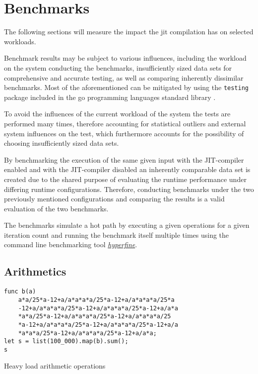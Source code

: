 \chapter{Benchmarks}
\label{sec:benchmarks}

The following sections will measure the impact the jit compilation has on
selected workloads.

Benchmark results may be subject to various influences, including the workload
on the system conducting the benchmarks, insufficiently sized data sets for
comprehensive and accurate testing, as well as comparing inherently dissimilar
benchmarks. Most of the aforementioned can be mitigated by using the
\texttt{testing} package included in the go programming languages standard
library \cite{go_testing}. 

To avoid the influences of the current workload of the system the tests are
performed many times, therefore accounting for statistical outliers and
external system influences on the test, which furthermore accounts for the
possibility of choosing insufficiently sized data sets.

By benchmarking the execution of the same given input with the JIT-compiler
enabled and with the JIT-compiler disabled an inherently comparable data set is
created due to the shared purpose of evaluating the runtime performance under
differing runtime configurations. Therefore, conducting benchmarks under the
two previously mentioned configurations and comparing the results is a valid
evaluation of the two benchmarks.

The benchmarks simulate a hot path by executing a given operations for a given
iteration count and running the benchmark itself multiple times using the
command line benchmarking tool
\href{https://github.com/sharkdp/hyperfine}{\textit{hyperfine}}.


\section{Arithmetics}

\begin{listing}[H]
    \begin{verbatim}
func b(a)
    a*a/25*a-12+a/a*a*a*a/25*a-12+a/a*a*a*a/25*a
    -12+a/a*a*a*a/25*a-12+a/a*a*a*a/25*a-12+a/a*a
    *a*a/25*a-12+a/a*a*a*a/25*a-12+a/a*a*a*a/25
    *a-12+a/a*a*a*a/25*a-12+a/a*a*a*a/25*a-12+a/a
    *a*a*a/25*a-12+a/a*a*a*a/25*a-12+a/a*a;
let s = list(100_000).map(b).sum();
s
    \end{verbatim}
    \caption{Heavy load arithmetic operations}
    \label{code:benchmark-arithmetics}
\end{listing}

